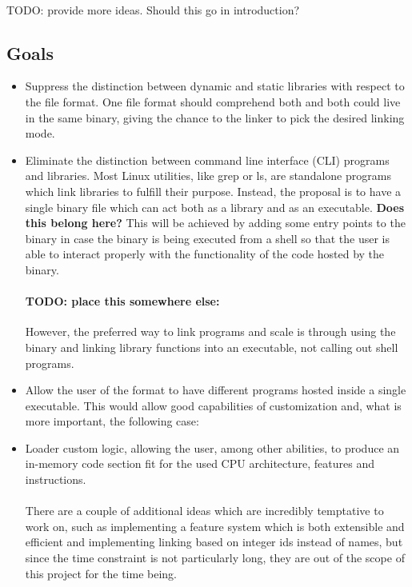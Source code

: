 \documentclass[12pt]{article}
\begin{document}
	\paragraph{}TODO: provide more ideas. Should this go in introduction?
	\subsection{Goals}
	\begin{itemize}
		\item Suppress the distinction between dynamic and static libraries with respect to the file format. One file format should comprehend both and both could live in the same binary, giving the chance to the linker to pick the desired linking mode.
		\item Eliminate the distinction between command line interface (CLI) programs and libraries. Most Linux utilities, like grep or ls, are standalone programs which link libraries to fulfill their purpose. Instead, the proposal is to have a single binary file which can act both as a library and as an executable. \textbf{Does this belong here?} This will be achieved by adding some entry points to the binary in case the binary is being executed from a shell so that the user is able to interact properly with the functionality of the code hosted by the binary.
		\paragraph{TODO: place this somewhere else:}However, the preferred way to link programs and scale is through using the binary and linking library functions into an executable, not calling out shell programs.
		\item Allow the user of the format to have different programs hosted inside a single executable. This would allow good capabilities of customization and, what is more important, the following case:
		\item Loader custom logic, allowing the user, among other abilities, to produce an in-memory code section fit for the used CPU architecture, features and instructions.
		\paragraph{} There are a couple of additional ideas which are incredibly temptative to work on, such as implementing a feature system which is both extensible and efficient and implementing linking based on integer ids instead of names, but since the time constraint is not particularly long, they are out of the scope of this project for the time being.
	\end{itemize}
\end{document}
